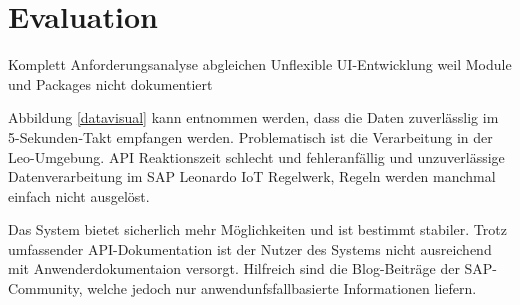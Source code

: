 \section{Evaluation}

Komplett Anforderungsanalyse abgleichen
Unflexible UI-Entwicklung weil Module und Packages nicht dokumentiert

Abbildung \ref{datavisual} kann entnommen werden, dass die Daten zuverlässlig im 5-Sekunden-Takt empfangen werden. Problematisch ist die Verarbeitung in der Leo-Umgebung.
API Reaktionszeit schlecht und fehleranfällig und unzuverlässige Datenverarbeitung im SAP Leonardo IoT Regelwerk,
Regeln werden manchmal einfach nicht ausgelöst.


Das System bietet sicherlich mehr Möglichkeiten und ist bestimmt stabiler. Trotz umfassender API-Dokumentation ist der Nutzer des Systems nicht ausreichend mit Anwenderdokumentaion versorgt. Hilfreich sind die Blog-Beiträge der SAP-Community, welche jedoch nur anwendunfsfallbasierte Informationen liefern.
\newpage
